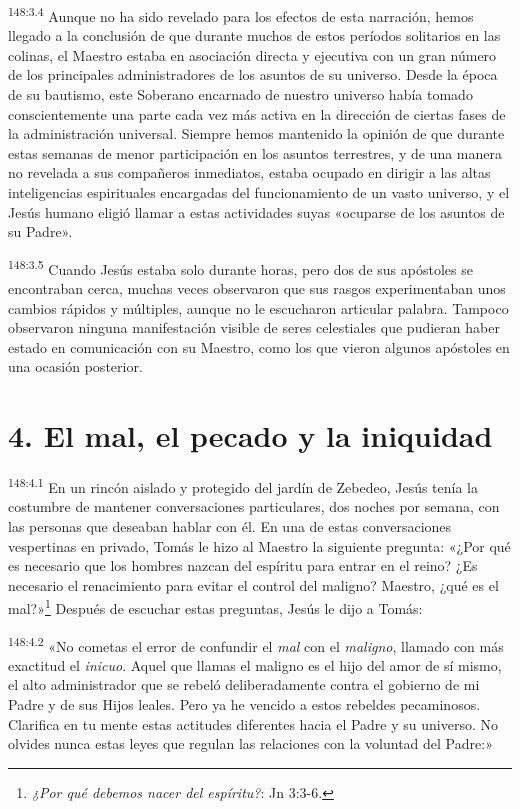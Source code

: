 \par 
\textsuperscript{148:3.4} Aunque no ha sido revelado para los efectos de esta narración, hemos llegado a la conclusión de que durante muchos de estos períodos solitarios en las colinas, el Maestro estaba en asociación directa y ejecutiva con un gran número de los principales administradores de los asuntos de su universo. Desde la época de su bautismo, este Soberano encarnado de nuestro universo había tomado conscientemente una parte cada vez más activa en la dirección de ciertas fases de la administración universal. Siempre hemos mantenido la opinión de que durante estas semanas de menor participación en los asuntos terrestres, y de una manera no revelada a sus compañeros inmediatos, estaba ocupado en dirigir a las altas inteligencias espirituales encargadas del funcionamiento de un vasto universo, y el Jesús humano eligió llamar a estas actividades suyas «ocuparse de los asuntos de su Padre».

\par 
\textsuperscript{148:3.5} Cuando Jesús estaba solo durante horas, pero dos de sus apóstoles se encontraban cerca, muchas veces observaron que sus rasgos experimentaban unos cambios rápidos y múltiples, aunque no le escucharon articular palabra. Tampoco observaron ninguna manifestación visible de seres celestiales que pudieran haber estado en comunicación con su Maestro, como los que vieron algunos apóstoles en una ocasión posterior.

\section*{4. El mal, el pecado y la iniquidad}
\par 
\textsuperscript{148:4.1} En un rincón aislado y protegido del jardín de Zebedeo, Jesús tenía la costumbre de mantener conversaciones particulares, dos noches por semana, con las personas que deseaban hablar con él. En una de estas conversaciones vespertinas en privado, Tomás le hizo al Maestro la siguiente pregunta: «¿Por qué es necesario que los hombres nazcan del espíritu para entrar en el reino? ¿Es necesario el renacimiento para evitar el control del maligno? Maestro, ¿qué es el mal?»\footnote{\textit{¿Por qué debemos nacer del espíritu?}: Jn 3:3-6.} Después de escuchar estas preguntas, Jesús le dijo a Tomás:

\par 
\textsuperscript{148:4.2} «No cometas el error de confundir el \textit{mal} con el \textit{maligno}, llamado con más exactitud el \textit{inicuo}. Aquel que llamas el maligno es el hijo del amor de sí mismo, el alto administrador que se rebeló deliberadamente contra el gobierno de mi Padre y de sus Hijos leales. Pero ya he vencido a estos rebeldes pecaminosos. Clarifica en tu mente estas actitudes diferentes hacia el Padre y su universo. No olvides nunca estas leyes que regulan las relaciones con la voluntad del Padre:»

